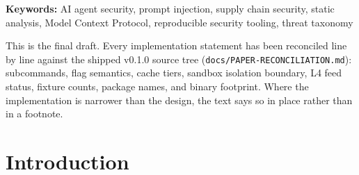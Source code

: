 \documentclass[11pt]{article}
\begin{document}
\begin{abstract}
\smallskip\noindent
We define a reproducible evaluation protocol against Cisco AI Defense Skill
Scanner and NVIDIA SkillSpector at pinned versions, specifying a 1{,}000-skill
public corpus, 55 synthetic attack fixtures spanning all SDTM-v1 classes, a
20-skill evasion corpus that is statically clean by construction, a 15-skill
adversarial-scanner corpus, and a 100-skill hard-negative corpus. The v0.1.0
release ships the protocol, the seeded generator, and 14 curated
fixtures---6 attack fixtures covering SD-01, SD-02, SD-03, SD-04, and SD-10;
3 benign fixtures; 4 benchmark skills; and 1 example skill. The public,
evasion, adversarial-scanner, hard-negative, and real-malware corpora are
specified but not yet populated. Section~\ref{sec:perf} reports the first
measured values for binary footprint, peak memory, and bulk throughput; every
latency figure, every detection figure in Section~\ref{sec:detection}, and
every baseline comparison remain unmeasured at v0.1.0. We pre-register
falsifiable targets and commit to publishing misses. Skill Doctor, its rule
packs, and its full benchmark harness are released under Apache-2.0.
\end{abstract}

\noindent\textbf{Keywords:} AI agent security, prompt injection, supply chain
security, static analysis, Model Context Protocol, reproducible security
tooling, threat taxonomy

\vspace{1em}

\begin{tcolorbox}[colback=blue!4,colframe=blue!45!black,
  title=\textbf{Reconciliation statement}]
\small
This is the final draft. Every implementation statement has been reconciled
line by line against the shipped v0.1.0 source tree
(\texttt{docs/PAPER-RECONCILIATION.md}): subcommands, flag semantics, cache
tiers, sandbox isolation boundary, L4 feed status, fixture counts, package
names, and binary footprint. Where the implementation is narrower than the
design, the text says so in place rather than in a footnote.
\end{tcolorbox}

\tableofcontents
\newpage

\section{Introduction}
\end{document}
